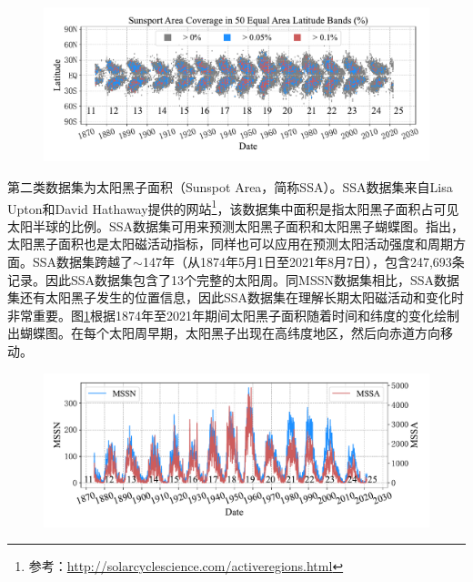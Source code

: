 \begin{figure}[!htbp]
  \vspace{-0.3cm}
  \centering
  \includegraphics[width=\textwidth]{Img/chap3_ss/ss_butterfly.pdf}
  \vspace{-1.4cm}
  \label{fig:ss_butterfly}
\end{figure}

第二类数据集为太阳黑子面积（Sunspot Area，简称SSA）。SSA数据集来自Lisa Upton和David Hathaway提供的网站\footnote{参考：\href{http://solarcyclescience.com/activeregions.html}{http://solarcyclescience.com/activeregions.html}}，该数据集中面积是指太阳黑子面积占可见太阳半球的比例。SSA数据集可用来预测太阳黑子面积和太阳黑子蝴蝶图。\citet{hathaway2015solar}指出，太阳黑子面积也是太阳磁活动指标，同样也可以应用在预测太阳活动强度和周期方面。SSA数据集跨越了$\sim$147年（从1874年5月1日至2021年8月7日），包含247,693条记录。因此SSA数据集包含了13个完整的太阳周。同MSSN数据集相比，SSA数据集还有太阳黑子发生的位置信息，因此SSA数据集在理解长期太阳磁活动和变化时非常重要。图\ref{fig:ss_butterfly}根据1874年至2021年期间太阳黑子面积随着时间和纬度的变化绘制出蝴蝶图。在每个太阳周早期，太阳黑子出现在高纬度地区，然后向赤道方向移动。

\begin{figure}[!htbp]
  \vspace{-0.3cm}
  \centering
  \includegraphics[width=\textwidth]{Img/chap3_ss/ss_number_area.pdf}
  \vspace{-1.4cm}
  \label{fig:ss_number_area}
\end{figure}

